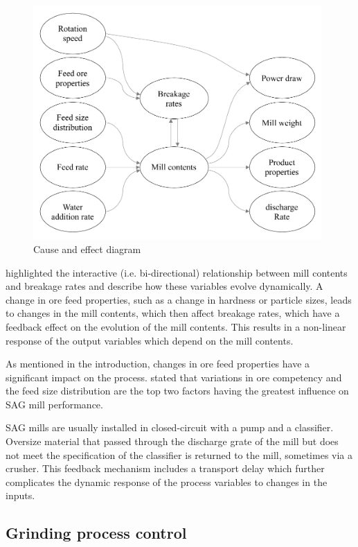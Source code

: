 \begin{figure}[htp]
	\centering
	\includegraphics[width=11cm]{images/cause-effect.pdf}
	\caption{Cause and effect diagram} \label{fig:cause-effect}
\end{figure}

\cite{powell_applying_2009} highlighted the interactive (i.e. bi-directional) relationship between mill contents and breakage rates and describe how these variables evolve dynamically. A change in ore feed properties, such as a change in hardness or particle sizes, leads to changes in the mill contents, which then affect breakage rates, which have a feedback effect on the evolution of the mill contents. This results in a non-linear response of the output variables which depend on the mill contents.

As mentioned in the introduction, changes in ore feed properties have a significant impact on the process. \cite{morrell_influence_2001} stated that variations in ore competency and the feed size distribution are the top two factors having the greatest influence on \gls{SAG} mill performance.

\gls{SAG} mills are usually installed in closed-circuit with a pump and a classifier. Oversize material that passed through the discharge grate of the mill but does not meet the specification of the classifier is returned to the mill, sometimes via a crusher. This feedback mechanism includes a transport delay which further complicates the dynamic response of the process variables to changes in the inputs.

\subsection{Grinding process control}


